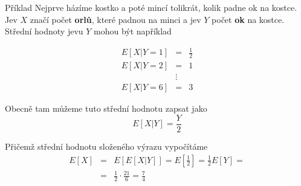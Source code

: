 	\begin{note}{Příklad}
	Nejprve házíme kostko a poté mincí tolikrát, kolik padne ok na kostce. Jev $X$ značí počet \textbf{orlů}, které padnou na minci a jev $Y$ počet \textbf{ok} na kostce. Střední hodnoty jevu $Y$ mohou být například
	
	\begin{eqnarray*}
		E[X|Y=1] & = & \frac{1}{2}\\
		E[X|Y=2] & = & 1\\
		&\vdots &\\
		E[X|Y=6] & = & 3
	\end{eqnarray*}
	
	Obecně tam můžeme tuto střední hodnotu zapsat jako
	\[ E[X|Y] = \frac{Y}{2} \]
	
	Přičemž střední hodnotu složeného výrazu vypočítáme
	\begin{eqnarray*}
	E[X] & = & E[E[X|Y]]=E\left[\frac{1}{2}\right] = \frac{1}{2}E[Y] =\\
	& = & \frac{1}{2}\cdot\frac{21}{6}=\frac{7}{4}
	\end{eqnarray*}
	
	\end{note}